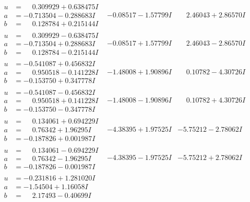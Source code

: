\documentclass[1p]{elsarticle_modified}
\theoremstyle{definition}
\begin{document}
$$\begin{array}{c|c|c}
\begin{aligned}
u &= \phantom{-}0.309929 + 0.638475 I \\
a &= -0.713504 - 0.288683 I \\
b &= \phantom{-}0.128784 + 0.215144 I\end{aligned}
 & -0.08517 - 1.57799 I & \phantom{-}2.46043 + 2.86570 I \\ \hline\begin{aligned}
u &= \phantom{-}0.309929 - 0.638475 I \\
a &= -0.713504 + 0.288683 I \\
b &= \phantom{-}0.128784 - 0.215144 I\end{aligned}
 & -0.08517 + 1.57799 I & \phantom{-}2.46043 - 2.86570 I \\ \hline\begin{aligned}
u &= -0.541087 + 0.456832 I \\
a &= \phantom{-}0.950518 - 0.141228 I \\
b &= -0.153750 + 0.347778 I\end{aligned}
 & -1.48008 + 1.90896 I & \phantom{-}0.10782 - 4.30726 I \\ \hline\begin{aligned}
u &= -0.541087 - 0.456832 I \\
a &= \phantom{-}0.950518 + 0.141228 I \\
b &= -0.153750 - 0.347778 I\end{aligned}
 & -1.48008 - 1.90896 I & \phantom{-}0.10782 + 4.30726 I \\ \hline\begin{aligned}
u &= \phantom{-}0.134061 + 0.694229 I \\
a &= \phantom{-}0.76342 + 1.96295 I \\
b &= -0.187826 + 0.001987 I\end{aligned}
 & -4.38395 + 1.97525 I & -5.75212 - 2.78062 I \\ \hline\begin{aligned}
u &= \phantom{-}0.134061 - 0.694229 I \\
a &= \phantom{-}0.76342 - 1.96295 I \\
b &= -0.187826 - 0.001987 I\end{aligned}
 & -4.38395 - 1.97525 I & -5.75212 + 2.78062 I \\ \hline\begin{aligned}
u &= -0.231816 + 1.281020 I \\
a &= -1.54504 + 1.16058 I \\
b &= \phantom{-}2.17493 - 0.40699 I\end{aligned}

\end{array}$$
\end{document}
